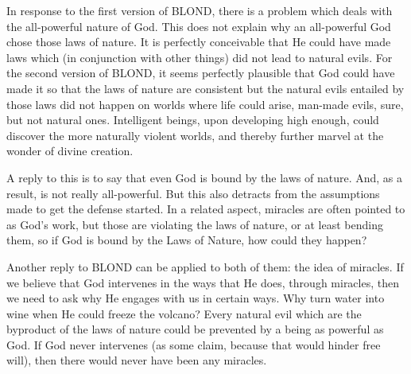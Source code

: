 In response to the first version of BLOND, there is a problem which deals with the all-powerful nature of God. This does not explain why an all-powerful God chose those laws of nature. It is perfectly conceivable that He could have made laws which (in conjunction with other things) did not lead to natural evils. For the second version of BLOND, it seems perfectly plausible that God could have made it so that the laws of nature are consistent but the natural evils entailed by those laws did not happen on worlds where life could arise, man-made evils, sure, but not natural ones. Intelligent beings, upon developing high enough, could discover the more naturally violent worlds, and thereby further marvel at the wonder of divine creation.

A reply to this is to say that even God is bound by the laws of nature. And, as a result, is not really all-powerful. But this also detracts from the assumptions made to get the defense started.  In a related aspect, miracles are often pointed to as God’s work, but those are violating the laws of nature, or at least bending them, so if God is bound by the Laws of Nature, how could they happen?

Another reply to BLOND can be applied to both of them: the idea of miracles. If we believe that God intervenes in the ways that He does, through miracles, then we need to ask why He engages with us in certain ways. Why turn water into wine when He could freeze the volcano? Every natural evil which are the byproduct of the laws of nature could be prevented by a being as powerful as God. If God never intervenes (as some claim, because that would hinder free will), then there would never have been any miracles. 